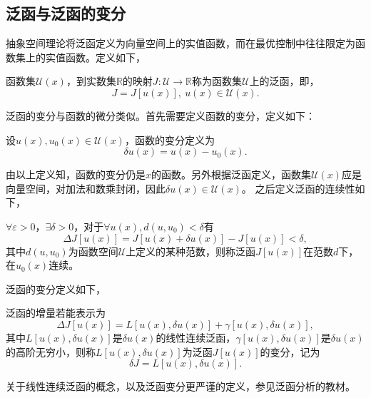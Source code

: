 \subsection{泛函与泛函的变分}
抽象空间理论将泛函定义为向量空间上的实值函数，而在最优控制中往往限定为函数集上的实值函数。定义如下，
\begin{definition}[泛函]
函数集$\mathcal{U}(x)$，到实数集$\mathbb{R}$的映射$J: \mathcal{U}\rightarrow \mathbb{R}$称为函数集$\mathcal{U}$上的{\heiti 泛函}，即，
\begin{equation}
J=J[u(x)], \ u(x)\in \mathcal{U}(x).
\end{equation}
\end{definition}
泛函的变分与函数的微分类似。首先需要定义函数的变分，定义如下：
\begin{definition}[函数的变分]
设$u(x), u_0(x) \in \mathcal{U}(x)$，{\heiti 函数的变分}定义为
\begin{equation}
\delta u(x)=u(x) - u_0(x).
\end{equation}
\end{definition}
由以上定义知，函数的变分仍是$x$的函数。另外根据泛函定义，函数集$\mathcal{U}(x)$应是向量空间，对加法和数乘封闭，因此$\delta u(x)\in \mathcal{U}(x)$。
之后定义泛函的连续性如下，
\begin{definition}[泛函的连续性]
$\forall \varepsilon > 0$，$\exists \delta > 0$，对于$\forall u(x), d(u,u_0)<\delta$有
\begin{equation}
\Delta J[u(x)]=J[u(x)+\delta u(x)]-J[u(x)] < \delta,
\end{equation}
其中$d(u,u_0)$为函数空间$\mathcal{U}$上定义的某种范数，则称泛函$J[u(x)]$在范数$d$下，在$u_0(x)$连续。
\end{definition}
泛函的变分定义如下，
\begin{definition}[泛函的变分]
泛函的增量若能表示为
\begin{equation}
\Delta J[u(x)]=L[u(x),\delta u(x)] + \gamma[u(x), \delta u(x)],
\end{equation}
其中$L[u(x),\delta u(x)]$是$\delta u(x)$的线性连续泛函，$\gamma[u(x), \delta u(x)]$是$\delta u(x)$的高阶无穷小，则称$L[u(x),\delta u(x)]$为泛函$J[u(x)]$的变分，记为
\begin{equation}
\delta J = L[u(x),\delta u(x)].
\end{equation}
\end{definition}
关于线性连续泛函的概念，以及泛函变分更严谨的定义，参见泛函分析的教材\cite{PETERD2007Functional}。

